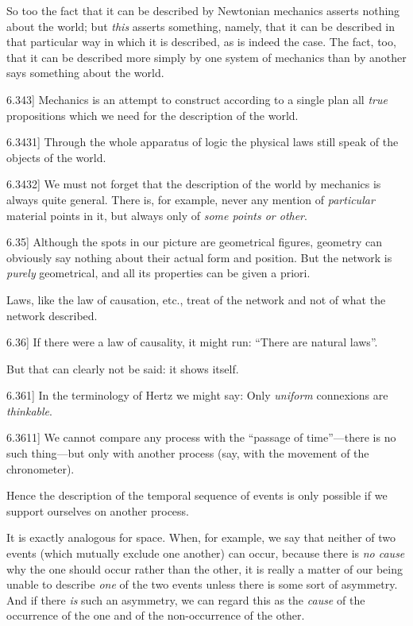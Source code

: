 \documentclass[12pt,oneside]{book}[2007/10/19]
\newcommand{\PropositionE}[2]{%
  \item[\phantomsection\label{PropE:#1}\PropGRef{#1}] #2%
}
\newcommand{\PropGRef}[1]{\hyperref[PropG:#1]{#1}}
\begin{document}
\begin{propositions}
{So too the fact that it can be described by
Newtonian mechanics asserts nothing about the
world; but \emph{this} asserts something, namely, that
it can be described in that particular way in which
it is described, as is indeed the case. The fact,
too, that it can be described more simply by one
system of mechanics than by another says something
about the world.}


\PropositionE{6.343}
{Mechanics is an attempt to construct according
to a single plan all \emph{true} propositions which we
need for the description of the world.}


\PropositionE{6.3431}
{Through the whole apparatus of logic the
physical laws still speak of the objects of the
world.}


\PropositionE{6.3432}
{We must not forget that the description of the
world by mechanics is always quite general.
There is, for example, never any mention of
\emph{particular} material points in it, but always only
of \emph{some points or other}.}


\PropositionE{6.35}
{Although the spots in our picture are geometrical
figures, geometry can obviously say nothing
about their actual form and position. But the
network is \emph{purely} geometrical, and all its properties
can be given a priori.

Laws, like the law of causation, etc., treat
of the network and not of what the network
described.}


\PropositionE{6.36}
{If there were a law of causality, it might run:
``There are natural laws''.

But that can clearly not be said: it shows
itself.}


\PropositionE{6.361}
{In the terminology of Hertz we might say:
Only \emph{uniform} connexions are \emph{thinkable}.}


\PropositionE{6.3611}
{We cannot compare any process with the
``passage of time''---there is no such thing---but
only with another process (say, with the movement
of the chronometer).

Hence the description of the temporal sequence
of events is only possible if we support ourselves
on another process.

It is exactly analogous for space. When, for
example, we say that neither of two events (which
mutually exclude one another) can occur, because
there is \emph{no cause} why the one should occur rather
than the other, it is really a matter of our being
unable to describe \emph{one} of the two events unless
there is some sort of asymmetry. And if there \emph{is}
such an asymmetry, we can regard this as the
\emph{cause} of the occurrence of the one and of the non-occurrence
of the other.}



\end{propositions}
\end{document}
